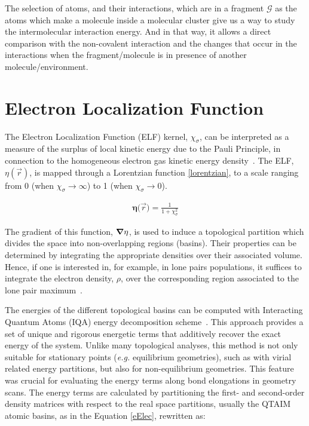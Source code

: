 %
The selection of atoms, and their interactions, which are in a fragment
$\mathscr{G}$ as the atoms which make a molecule inside a molecular cluster
give us a way to study the intermolecular interaction energy. And in that way,
it allows a direct comparison with the non-covalent interaction and the changes
that occur in the interactions when 
the fragment/molecule is in presence of another molecule/environment.

\section{Electron Localization Function}\label{elftheory}

The Electron Localization Function (ELF) kernel, $\chi_{\sigma}$, can be
interpreted as a measure of the surplus of local kinetic energy due to the
Pauli Principle, in connection to the homogeneous electron gas kinetic energy
density~\cite{Savin1992}. The ELF, $\eta(\vec{r})$, is mapped through a Lorentzian
function \ref{lorentzian}, to a scale ranging from 0 (when $\chi_{\sigma}
\rightarrow \infty$) to 1 (when $\chi_{\sigma} \rightarrow 0$).

\begin{align}
\mathbf{\eta(}\vec{r}) = \frac1{1+\chi_{\sigma}^{2}}
\label{lorentzian}
\end{align}

The gradient of this function, $\grad \eta$, is used to induce a topological
partition which divides the space into non-overlapping regions
(basins). Their properties can be determined by integrating
the appropriate densities over their associated volume. Hence, if one is interested
in, for example, in lone pairs populations, it suffices to integrate the
electron density, $\rho$, over the corresponding region associated to the lone
pair maximum~\cite{Munrriz2019}.

The energies of the different topological basins can be computed with
Interacting Quantum Atoms (IQA) energy decomposition scheme~\cite{Blanco2005}. This
approach provides a set of unique and rigorous energetic terms that additively
recover the exact energy of the system. Unlike many topological analyses, this
method is not only suitable for stationary points (\textit{e.g.} equilibrium
geometries), such as with virial related energy partitions, but also for
non-equilibrium geometries. This feature was crucial for evaluating the energy
terms along bond elongations in geometry scans. The energy terms are calculated
by partitioning the first- and second-order density matrices with respect to
the real space partitions, usually the QTAIM atomic basins, as in the Equation
\ref{eElec}, rewritten as:


